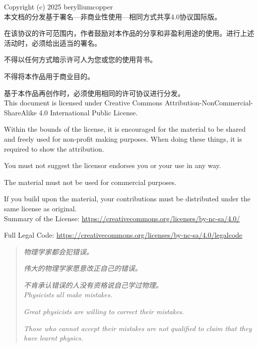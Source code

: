 \documentclass[11pt,a4paper,onecolumn,UTF8]{ctexart}
\begin{document}
	\newpage
	\thispagestyle{empty}
	
	Copyright (c) 2025 berylliumcopper\\[5ex]
	
	本文档的分发基于署名—非商业性使用—相同方式共享4.0协议国际版。
	
	在该协议的许可范围内，作者鼓励对本作品的分享和非盈利用途的使用。进行上述活动时，必须给出适当的署名。
	
	不得以任何方式暗示许可人为您或您的使用背书。
	
	不得将本作品用于商业目的。
	
	基于本作品再创作时，必须使用相同的许可协议进行分发。\\[5ex]
	
	This document is licensed under Creative Commons Attribution-NonCommercial-ShareAlike 4.0 International Public License. 
	
	Within the bounds of the license, it is encouraged for the material to be shared and freely used for non-profit making purposes. When doing these things, it is required to show the attribution.
	
	You must not suggest the licensor endorses you or your use in any way.
	
	The material must not be used for commercial purposes.
	
	If you build upon the material, your contributions must be distributed under the same license as original.\\[5ex]
	
	Summary of the License: \href{https://creativecommons.org/licenses/by-nc-sa/4.0/}{https://creativecommons.org/licenses/by-nc-sa/4.0/}
	
	Full Legal Code: \href{https://creativecommons.org/licenses/by-nc-sa/4.0/legalcode}{https://creativecommons.org/licenses/by-nc-sa/4.0/legalcode}\\[5ex]
	
	\newpage
	\thispagestyle{empty}
	
	\vspace*{\fill}
	\begin{quotation}
		
		\textit{物理学家都会犯错误。}
		
		\textit{伟大的物理学家愿意改正自己的错误。}
		
		\textit{不肯承认错误的人没有资格说自己学过物理。}\\[2ex]
		
	
		\textit{Physicists all make mistakes.}
	
		\textit{Great physicists are willing to correct their mistakes.}
	
		\textit{Those who cannot accept their mistakes are not qualified to claim that they have learnt physics.}\\[6ex]
	
	\end{quotation}
	
\end{document}
